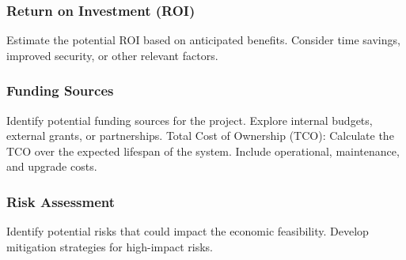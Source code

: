 \subsubsection{Return on Investment (ROI)}
Estimate the potential ROI based on anticipated benefits.
Consider time savings, improved security, or other relevant factors.
\subsubsection{Funding Sources}

Identify potential funding sources for the project.
Explore internal budgets, external grants, or partnerships.
Total Cost of Ownership (TCO):
Calculate the TCO over the expected lifespan of the system.
Include operational, maintenance, and upgrade costs.

\subsubsection{Risk Assessment}
Identify potential risks that could impact the economic feasibility.
Develop mitigation strategies for high-impact risks.